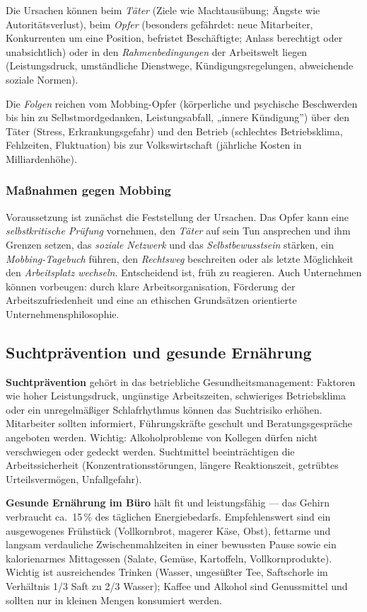 \documentclass[11pt, a4paper]{article}
\begin{document}
Die Ursachen können beim \emph{Täter} (Ziele wie Machtausübung; Ängste wie Autoritätsverlust),
beim \emph{Opfer} (besonders gefährdet: neue Mitarbeiter, Konkurrenten um eine Position,
befristet Beschäftigte; Anlass berechtigt oder unabsichtlich) oder in den
\emph{Rahmenbedingungen} der Arbeitswelt liegen (Leistungsdruck, umständliche Dienstwege,
Kündigungsregelungen, abweichende soziale Normen).

Die \emph{Folgen} reichen vom Mobbing-Opfer (körperliche und psychische Beschwerden bis hin
zu Selbstmordgedanken, Leistungsabfall, „innere Kündigung”) über den Täter (Stress,
Erkrankungsgefahr) und den Betrieb (schlechtes Betriebsklima, Fehlzeiten, Fluktuation) bis
zur Volkswirtschaft (jährliche Kosten in Milliardenhöhe).

\subsubsection{Maßnahmen gegen Mobbing}

Voraussetzung ist zunächst die Feststellung der Ursachen. Das Opfer kann eine
\emph{selbstkritische Prüfung} vornehmen, den \emph{Täter} auf sein Tun ansprechen und
ihm Grenzen setzen, das \emph{soziale Netzwerk} und das \emph{Selbstbewusstsein} stärken,
ein \emph{Mobbing-Tagebuch} führen, den \emph{Rechtsweg} beschreiten oder als letzte
Möglichkeit den \emph{Arbeitsplatz wechseln}. Entscheidend ist, früh zu reagieren. Auch
Unternehmen können vorbeugen: durch klare Arbeitsorganisation, Förderung der
Arbeitszufriedenheit und eine an ethischen Grundsätzen orientierte Unternehmensphilosophie.

\subsection{Suchtprävention und gesunde Ernährung}

\textbf{Suchtprävention} gehört in das betriebliche Gesundheitsmanagement: Faktoren wie
hoher Leistungsdruck, ungünstige Arbeitszeiten, schwieriges Betriebsklima oder ein
unregelmäßiger Schlafrhythmus können das Suchtrisiko erhöhen. Mitarbeiter sollten
informiert, Führungskräfte geschult und Beratungsgespräche angeboten werden. Wichtig:
Alkoholprobleme von Kollegen dürfen nicht verschwiegen oder gedeckt werden. Suchtmittel
beeinträchtigen die Arbeitssicherheit (Konzentrationsstörungen, längere Reaktionszeit,
getrübtes Urteilsvermögen, Unfallgefahr).

\textbf{Gesunde Ernährung im Büro} hält fit und leistungsfähig --- das Gehirn verbraucht
ca.\ 15\,\% des täglichen Energiebedarfs. Empfehlenswert sind ein ausgewogenes Frühstück
(Vollkornbrot, magerer Käse, Obst), fettarme und langsam verdauliche Zwischenmahlzeiten in
einer bewussten Pause sowie ein kalorienarmes Mittagessen (Salate, Gemüse, Kartoffeln,
Vollkornprodukte). Wichtig ist ausreichendes Trinken (Wasser, ungesüßter Tee, Saftschorle
im Verhältnis 1/3 Saft zu 2/3 Wasser); Kaffee und Alkohol sind Genussmittel und sollten nur
in kleinen Mengen konsumiert werden.
\end{document}
